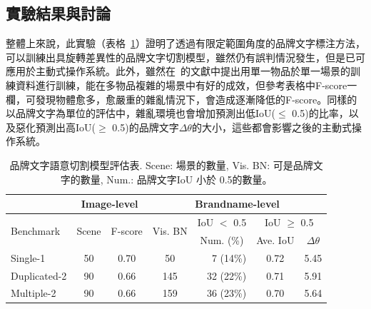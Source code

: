 \subsection{實驗結果與討論}
整體上來說，此實驗（表格~\ref{tbl:segmentation}）證明了透過有限定範圍角度的品牌文字標注方法，可以訓練出具旋轉差異性的品牌文字切割模型，雖然仍有誤判情況發生，但是已可應用於主動式操作系統。此外，雖然在~\cite{zeng2016multi}的文獻中提出用單一物品於單一場景的訓練資料進行訓練，能在多物品複雜的場景中有好的成效，但參考表格中F-score一欄，可發現物體愈多，愈嚴重的雜亂情況下，會造成逐漸降低的F-score。同樣的以品牌文字為單位的評估中，雜亂環境也會增加預測出低IoU($ \le$ 0.5)的比率，以及惡化預測出高IoU($ \ge$  0.5)的品牌文字$\Delta\theta$的大小，這些都會影響之後的主動式操作系統。

\begin{table}[H]
\centering
\caption{品牌文字語意切割模型評估表. Scene: 場景的數量, Vis. BN: 可是品牌文字的數量, Num.: 品牌文字IoU 小於 0.5的數量。}
\label{tbl:segmentation}
\tabcolsep=4pt
\begin{tabular}{l|cc|crcc}
\hline
                               & \multicolumn{2}{c|}{Image-level}                         & \multicolumn{4}{c}{Brandname-level}                                                                                        \\ \hline
\multirow{2}{*}{Benchmark}     & \multirow{2}{*}{Scene}    & \multirow{2}{*}{F-score}     & \multirow{2}{*}{Vis. BN}     & \multicolumn{1}{|c|}{IoU $<$ 0.5} & \multicolumn{2}{c}{IoU $\ge$ 0.5}                                  \\ \cline{5-7}
                               &                           &                              &                         & \multicolumn{1}{|c|}{Num. (\%)}        & \multicolumn{1}{c|}{Ave. IoU} & \multicolumn{1}{c}{$\Delta$$\theta$} \\ \hline
Single-1                       & 50                        & 0.70                & 50                      & 7  (14\%)                         & 0.72                          &  5.45                               \\
Duplicated-2                   & 90                        & 0.66                         & 145                     & 32 (22\%)                         & 0.71                          &  5.91                               \\
Multiple-2                     & 90                        & 0.66                         & 159                     & 36 (23\%)                         & 0.70                          &  5.64                               \\

\end{tabular}
\end{table}
